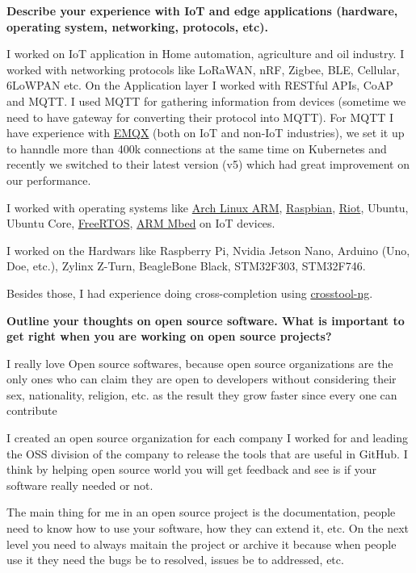 \noindent
\textbf{Describe your experience with IoT and edge applications (hardware, operating system, networking, protocols, etc).}

I worked on IoT application in Home automation, agriculture and oil industry. I worked with networking protocols
like LoRaWAN, nRF, Zigbee, BLE, Cellular, 6LoWPAN etc.
On the Application layer I worked with RESTful APIs, CoAP and MQTT.
I used MQTT for gathering information from devices
(sometime we need to have gateway for converting their protocol into MQTT). For MQTT I have experience with
\href{https://github.com/emqx/emqx}{EMQX} (both on IoT and non-IoT industries), we set it up to hanndle more than 400k connections
at the same time on Kubernetes and recently we switched to their latest version (v5) which had great improvement on our performance.

I worked with operating systems like \href{https://archlinuxarm.org/}{Arch Linux ARM}, \href{https://www.raspbian.org/}{Raspbian},
\href{https://www.riot-os.org/}{Riot}, Ubuntu, Ubuntu Core, \href{https://www.freertos.org/index.html}{FreeRTOS},
\href{https://os.mbed.com/}{ARM Mbed} on IoT devices.

I worked on the Hardwars like Raspberry Pi, Nvidia Jetson Nano, Arduino (Uno, Doe, etc.), Zylinx Z-Turn, BeagleBone Black,
STM32F303, STM32F746.

Besides those, I had experience doing cross-completion using \href{https://github.com/crosstool-ng/crosstool-ng}{crosstool-ng}.

\noindent
\textbf{Outline your thoughts on open source software.
What is important to get right when you are working on open source projects?}

I really love Open source softwares, because open source organizations are the only ones who can claim they are open
to developers without considering their sex, nationality, religion, etc. as the result they grow faster since every
one can contribute

I created an open source organization for each company I worked for and leading
the OSS division of the company to release the tools that are useful in GitHub. I think by helping open source world
you will get feedback and see is if your software really needed or not.

The main thing for me in an open source project is the documentation, people need to know how to use your software,
how they can extend it, etc. On the next level you need to always maitain the project or archive it because
when people use it they need the bugs be to resolved, issues be to addressed, etc.

